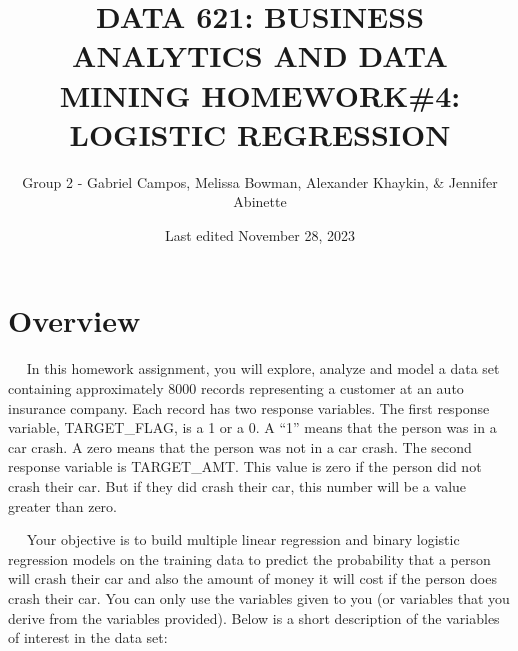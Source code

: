 \documentclass[
]{article}
\title{DATA 621: BUSINESS ANALYTICS AND DATA MINING HOMEWORK\#4:
LOGISTIC REGRESSION}
\author{Group 2 - Gabriel Campos, Melissa Bowman, Alexander Khaykin, \&
Jennifer Abinette}
\date{Last edited November 28, 2023}
\begin{document}
\maketitle

{
\hypersetup{linkcolor=}
\setcounter{tocdepth}{4}
\tableofcontents
}
\hypertarget{overview}{%
\section{Overview}\label{overview}}

  In this homework assignment, you will explore, analyze and model a
data set containing approximately 8000 records representing a customer
at an auto insurance company. Each record has two response variables.
The first response variable, TARGET\_FLAG, is a 1 or a 0. A ``1'' means
that the person was in a car crash. A zero means that the person was not
in a car crash. The second response variable is TARGET\_AMT. This value
is zero if the person did not crash their car. But if they did crash
their car, this number will be a value greater than zero.

  Your objective is to build multiple linear regression and binary
logistic regression models on the training data to predict the
probability that a person will crash their car and also the amount of
money it will cost if the person does crash their car. You can only use
the variables given to you (or variables that you derive from the
variables provided). Below is a short description of the variables of
interest in the data set:
\end{document}

